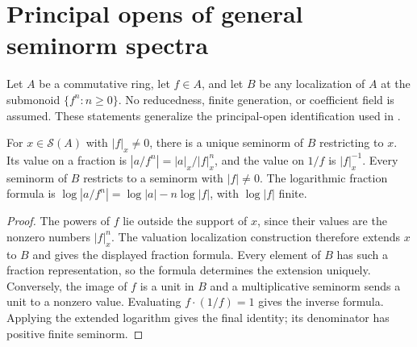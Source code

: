 \section{Principal opens of general seminorm spectra}\label{sec:general-localization}

Let $A$ be a commutative ring, let $f\in A$, and let $B$ be any localization of
$A$ at the submonoid $\{f^n:n\ge0\}$. No reducedness, finite generation,
or coefficient field is assumed. These statements generalize the principal-open
identification used in \cite[\S5]{FHX}.

\begin{lemma}
\label{spectrum:localization-extension}
\leanok
{}
For $x\in\mathcal S(A)$ with $|f|_x\ne0$, there is a unique seminorm of $B$
restricting to $x$. Its value on a fraction is
$|a/f^n|=|a|_x/|f|_x^n$, and the value on $1/f$ is $|f|_x^{-1}$.
Every seminorm of $B$ restricts to a seminorm with $|f|\ne0$.
The logarithmic fraction formula is
$\log|a/f^n|=\log|a|-n\log|f|$, with $\log|f|$ finite.
\end{lemma}
\begin{proof}
The powers of $f$ lie outside the support of $x$, since their values are the
nonzero numbers $|f|_x^n$. The valuation localization construction therefore
extends $x$ to $B$ and gives the displayed fraction formula. Every element of
$B$ has such a fraction representation, so the formula determines the
extension uniquely. Conversely, the image of $f$ is a unit in $B$ and a
multiplicative seminorm sends a unit to a nonzero value. Evaluating
$f\cdot(1/f)=1$ gives the inverse formula. Applying the extended logarithm
gives the final identity; its denominator has positive finite seminorm.
\end{proof}

